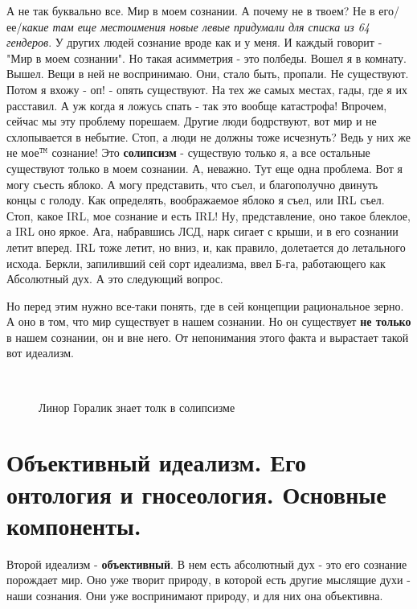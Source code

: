 А не так буквально все. Мир в моем сознании. А почему не в твоем? Не в его/ее/\textit{какие там еще местоимения новые левые придумали для списка из 64 гендеров}. У других людей сознание вроде как и у меня. И каждый говорит - "Мир в моем сознании". Но такая асимметрия - это полбеды. Вошел я в комнату. Вышел. Вещи в ней не воспринимаю. Они, стало быть, пропали. Не существуют. Потом я вхожу - оп! - опять существуют. На тех же самых местах, гады, где я их расставил. А уж когда я ложусь спать - так это вообще катастрофа! Впрочем, сейчас мы эту проблему порешаем. Другие люди бодрствуют, вот мир и не схлопывается в небытие. Стоп, а люди не должны тоже исчезнуть? Ведь у них же не мое${}^\mathtt{TM}$ сознание! Это \textbf{солипсизм} - существую только я, а все остальные существуют только в моем сознании. А, неважно. Тут еще одна проблема. Вот я могу съесть яблоко. А могу представить, что съел, и благополучно двинуть концы с голоду. Как определять, воображаемое яблоко я съел, или IRL съел. Стоп, какое IRL, мое сознание и есть IRL! Ну, представление, оно такое блеклое, а IRL оно яркое. Ага, набравшись ЛСД, нарк сигает с крыши, и в его сознании летит вперед. IRL тоже летит, но вниз, и, как правило, долетается до летального исхода. Беркли, запиливший сей сорт идеализма, ввел Б-га, работающего как Абсолютный дух. А это следующий вопрос.

Но перед этим нужно все-таки понять, где в сей концепции рациональное зерно. А оно в том, что мир существует в нашем сознании. Но он существует \textbf{не только} в нашем сознании, он и вне него. От непонимания этого факта и вырастает такой вот идеализм.

\begin{figure}[h]
\\
\caption{Линор Горалик знает толк в солипсизме}
\end{figure}

\section{ Объективный идеализм. Его онтология и гносеология. Основные компоненты.}
Второй идеализм - \textbf{объективный}. В нем есть абсолютный дух - это его сознание порождает мир. Оно уже творит природу, в которой есть другие мыслящие духи - наши сознания. Они уже воспринимают природу, и для них она объективна.

